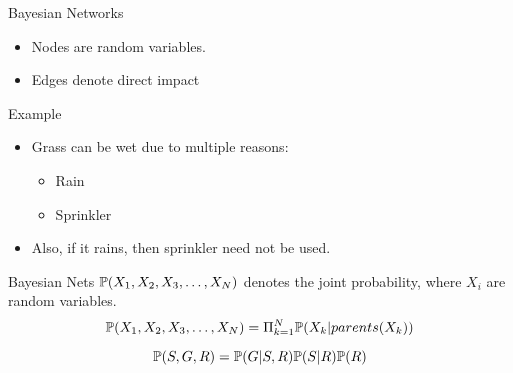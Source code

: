 \documentclass{beamer}
\begin{document}
\begin{frame}{Bayesian Networks}
\begin{tikzpicture}[x=0.75pt,y=0.75pt,yscale=-1,xscale=1]
        
        \end{tikzpicture}
        
\begin{itemize}
	
	
	\item Nodes are random variables.
	\item Edges denote direct impact

	
\end{itemize}
\end{frame}

\begin{frame}{Example}
\begin{itemize}

\item Grass can be wet due to multiple reasons:
\begin{itemize}
    \item Rain
    \item Sprinkler
\end{itemize}
\item Also, if it rains, then sprinkler need not be used.
\end{itemize}

    


	

\end{frame}

\begin{frame}{Bayesian Nets}
    $\Prob(X_{1},X_{2},X_{3},\dots,X_{N})$ denotes the joint probability, where $X_{i}$ are random variables.
    \begin{equation*}
        \Prob(X_{1},X_{2},X_{3},\dots,X_{N}) = \Pi_{k=1}^{N} \Prob(X_{k} | parents(X_{k}))
    \end{equation*}
    
    
    \begin{equation*}
        \Prob(S,G,R) =  \Prob(G|S,R)\Prob(S|R)\Prob(R)
    \end{equation*}
    
\end{frame}
\end{document}
